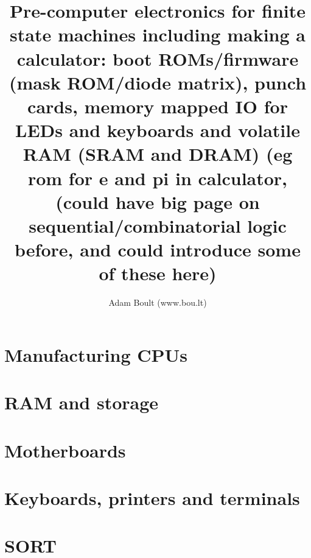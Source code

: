 \documentclass[oneside]{book}
\begin{document}
\author{Adam Boult (www.bou.lt)}
\title{Pre-computer electronics for finite state machines including making a calculator: boot ROMs/firmware (mask ROM/diode matrix), punch cards, memory mapped IO for LEDs and keyboards and volatile RAM (SRAM and DRAM) (eg rom for e and pi in calculator, (could have big page on sequential/combinatorial logic before, and could introduce some of these here)}
\maketitle

\setcounter{tocdepth}{0}
\tableofcontents



\part{Manufacturing CPUs}

\part{RAM and storage}

\part{Motherboards}

\part{Keyboards, printers and terminals}

\part{SORT}

\end{document}
